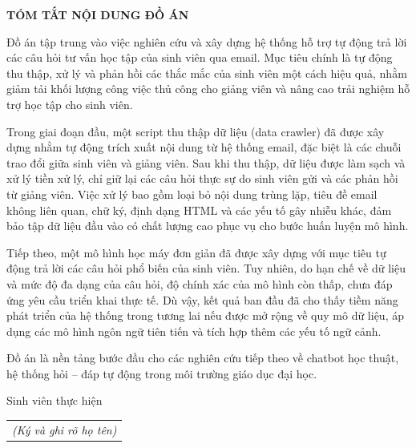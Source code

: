 \documentclass[../DoAn.tex]{subfiles}
\begin{document}
\begin{center}
    \Large{\textbf{TÓM TẮT NỘI DUNG ĐỒ ÁN}}\\
\end{center}
\vspace{1cm}
Đồ án tập trung vào việc nghiên cứu và xây dựng hệ thống hỗ trợ tự động trả lời các câu hỏi tư vấn học tập của sinh viên qua email. Mục tiêu chính là tự động thu thập, xử lý và phản hồi các thắc mắc của sinh viên một cách hiệu quả, nhằm giảm tải khối lượng công việc thủ công cho giảng viên và nâng cao trải nghiệm hỗ trợ học tập cho sinh viên.

Trong giai đoạn đầu, một script thu thập dữ liệu (data crawler) đã được xây dựng nhằm tự động trích xuất nội dung từ hệ thống email, đặc biệt là các chuỗi trao đổi giữa sinh viên và giảng viên. Sau khi thu thập, dữ liệu được làm sạch và xử lý tiền xử lý, chỉ giữ lại các câu hỏi thực sự do sinh viên gửi và các phản hồi từ giảng viên. Việc xử lý bao gồm loại bỏ nội dung trùng lặp, tiêu đề email không liên quan, chữ ký, định dạng HTML và các yếu tố gây nhiễu khác, đảm bảo tập dữ liệu đầu vào có chất lượng cao phục vụ cho bước huấn luyện mô hình.

Tiếp theo, một mô hình học máy đơn giản đã được xây dựng với mục tiêu tự động trả lời các câu hỏi phổ biến của sinh viên. Tuy nhiên, do hạn chế về dữ liệu và mức độ đa dạng của câu hỏi, độ chính xác của mô hình còn thấp, chưa đáp ứng yêu cầu triển khai thực tế. Dù vậy, kết quả ban đầu đã cho thấy tiềm năng phát triển của hệ thống trong tương lai nếu được mở rộng về quy mô dữ liệu, áp dụng các mô hình ngôn ngữ tiên tiến và tích hợp thêm các yếu tố ngữ cảnh.

Đồ án là nền tảng bước đầu cho các nghiên cứu tiếp theo về chatbot học thuật, hệ thống hỏi – đáp tự động trong môi trường giáo dục đại học.

\begin{flushright}
Sinh viên thực hiện\\
\begin{tabular}{@{}c@{}}
\textit{(Ký và ghi rõ họ tên)}
\end{tabular}
\end{flushright}
\end{document}
